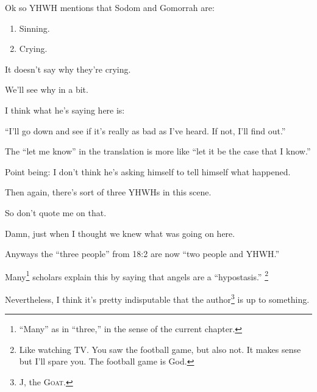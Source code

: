 {
}
{
}
{
	Ok so YHWH mentions that Sodom and Gomorrah are:
	
	\begin{enumerate}
	\item Sinning.
	\item Crying.
	\end{enumerate}

	It doesn't say why they're crying.
	
	We'll see why in a bit.
}

{
}
{
}
{
	I think what he's saying here is:
	
	``I'll go down and see if it's really as bad as I've heard. If not, I'll find out.''
	
	The ``let me know'' in the translation is more like ``let it be the case that I know.''

	
	Point being: I don't think he's asking himself to tell himself what happened.
	
	Then again, there's sort of three YHWHs in this scene.
	
	So don't quote me on that.

}

{
}
{
}
{
	Damn, just when I thought we knew what was going on here.

	Anyways the ``three people'' from 18:2 are now ``two people and YHWH.''	

	Many\footnote{``Many'' as in ``three,'' in the sense of the current chapter.}
	scholars explain this by saying that angels are a ``hypostasis.''%
	\footnote{
		Like watching TV. You saw the football game, but also not.
		It makes sense but I'll spare you. The football game is God.
	}

	Nevertheless, I think it's pretty indisputable that the author\footnote{J, the \textsc{Goat}.} is up to something.
}

